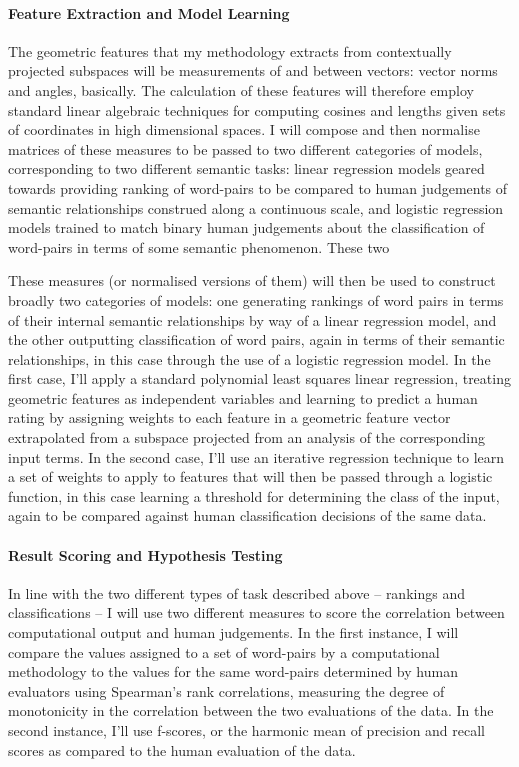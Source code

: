 \paragraph{Feature Extraction and Model Learning} The geometric features that my methodology extracts from contextually projected subspaces will be measurements of and between vectors: vector norms and angles, basically.  The calculation of these features will therefore employ standard linear algebraic techniques for computing cosines and lengths given sets of coordinates in high dimensional spaces.  I will compose and then normalise matrices of these measures to be passed to two different categories of models, corresponding to two different semantic tasks: linear regression models geared towards providing ranking of word-pairs to be compared to human judgements of semantic relationships construed along a continuous scale, and logistic regression models trained to match binary human judgements about the classification of word-pairs in terms of some semantic phenomenon.  These two 

These measures (or normalised versions of them) will then be used to construct broadly two categories of models: one generating rankings of word pairs in terms of their internal semantic relationships by way of a linear regression model, and the other outputting classification of word pairs, again in terms of their semantic relationships, in this case through the use of a logistic regression model.  In the first case, I'll apply a standard polynomial least squares linear regression, treating geometric features as independent variables and learning to predict a human rating by assigning weights to each feature in a geometric feature vector extrapolated from a subspace projected from an analysis of the corresponding input terms.  In the second case, I'll use an iterative regression technique to learn a set of weights to apply to features that will then be passed through a logistic function, in this case learning a threshold for determining the class of the input, again to be compared against human classification decisions of the same data.

\paragraph{Result Scoring and Hypothesis Testing} In line with the two different types of task described above -- rankings and classifications -- I will use two different measures to score the correlation between computational output and human judgements.  In the first instance, I will compare the values assigned to a set of word-pairs by a computational methodology to the values for the same word-pairs determined by human evaluators using Spearman's rank correlations, measuring the degree of monotonicity in the correlation between the two evaluations of the data.  In the second instance, I'll use f-scores, or the harmonic mean of precision and recall scores as compared to the human evaluation of the data.

